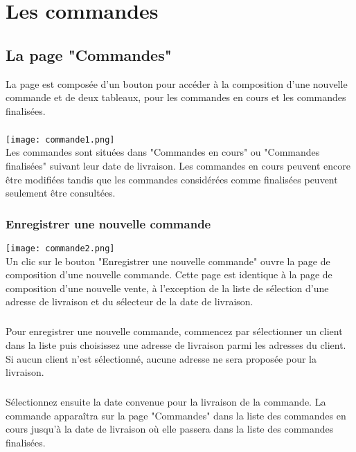 \chapter{Les commandes}

\section{La page "Commandes"}
La page est composée d'un bouton pour accéder à la composition d'une nouvelle
commande et de deux tableaux, pour les commandes en cours et les commandes
finalisées.

\paragraph{}

\texttt{[image: commande1.png]}\\

Les commandes sont situées dans "Commandes en cours" ou "Commandes finalisées"
suivant leur date de livraison. Les commandes en cours peuvent encore être
modifiées tandis que les commandes considérées comme finalisées peuvent
seulement être consultées.

\subsection{Enregistrer une nouvelle commande}

\texttt{[image: commande2.png]}\\

Un clic sur le bouton "Enregistrer une nouvelle commande" ouvre la page de
composition d'une nouvelle commande. Cette page est identique à la page de
composition d'une nouvelle vente, à l'exception de la liste de sélection
d'une adresse de livraison et du sélecteur de la date de livraison.

\paragraph{}
Pour enregistrer une nouvelle commande, commencez par sélectionner un client
dans la liste puis choisissez une adresse de livraison parmi les adresses du
client. Si aucun client n'est sélectionné, aucune adresse ne sera
proposée pour la livraison.

\paragraph{}
Sélectionnez ensuite la date convenue pour la livraison de la commande.
La commande apparaîtra sur la page "Commandes" dans la liste des commandes en
cours jusqu'à la date de livraison où elle passera dans la liste des commandes
finalisées.

